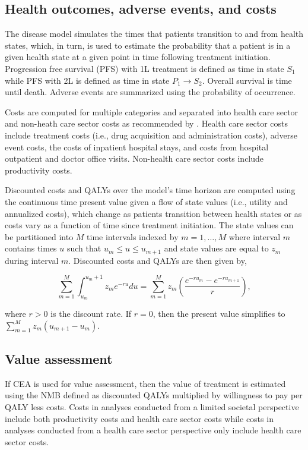\documentclass[11pt,final,fleqn]{article}\usepackage[]{graphicx}\usepackage[]{color}
\theoremstyle{plain}
\begin{document}
{\subsection{Health outcomes, adverse events, and costs}
The disease model simulates the times that patients transition to and from health states, which, in turn, is used to estimate the probability that a patient is in a given health state at a given point in time following treatment initiation. Progression free survival (PFS) with 1L treatment is defined as time in state $S_1$ while PFS with 2L is defined as time in state $P_1 \rightarrow S_2$. Overall survival is time until death. Adverse events are summarized using the probability of occurrence.  

Costs are computed for multiple categories and separated into health care sector and non-heath care sector costs as recommended by \citet{sanders2016recommendations}. Health care sector costs include treatment costs (i.e., drug acquisition and administration costs), adverse event costs, the costs of inpatient hospital stays, and costs from hospital outpatient and doctor office visits. Non-health care sector costs include productivity costs.

Discounted costs and QALYs over the model's time horizon are computed using the continuous time present value given a flow of state values (i.e., utility and annualized costs), which change as patients transition between health states or as costs vary as a function of time since treatment initiation. The state values can be partitioned into $M$ time intervals indexed by $m = 1,\ldots, M$ where interval $m$ contains times $u$ such that $u_m\leq u \leq u_{m+1}$ and state values are equal to $z_m$ during interval $m$. Discounted costs and QALYs are then given by,  

\begin{equation} \label{eqn:pv}
\sum_{m = 1}^M \int_{u_m}^{u_m+1} z_me^{-ru}du = \sum_{m = 1}^M z_m \left(\frac{e^{-r{u_{m}}} - e^{-r{u_{m+1}}}}{r}\right),
\end{equation}

where $r > 0$ is the discount rate. If $r = 0$, then the present value simplifies to $\sum_{m = 1}^M z_m(u_{m+1} - u_{m})$. 

\subsection{Value assessment} \label{subsec:outcomes-value-assessment}
If CEA is used for value assessment, then the value of treatment is estimated using the NMB defined as discounted QALYs multiplied by willingness to pay per QALY less costs. Costs in analyses conducted from a limited societal perspective include both productivity costs and health care sector costs while costs in analyses conducted from a health care sector perspective only include health care sector costs. 

}
\end{document}
